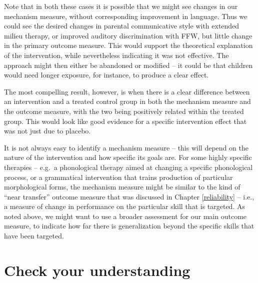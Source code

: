 \documentclass{krantz}
\begin{document}
Note that in both these cases it is possible that we might see changes in our mechanism measure, without corresponding improvement in language. Thus we could see the desired changes in parental communicative style with extended milieu therapy, or improved auditory discrimination with FFW, but little change in the primary outcome measure. This would support the theoretical explanation of the intervention, while nevertheless indicating it was not effective. The approach might then either be abandoned or modified -- it could be that children would need longer exposure, for instance, to produce a clear effect.

The most compelling result, however, is when there is a clear difference between an intervention and a treated control group in both the mechanism measure and the outcome measure, with the two being positively related within the treated group. This would look like good evidence for a specific intervention effect that was not just due to placebo.

It is not always easy to identify a mechanism measure -- this will depend on the nature of the intervention and how specific its goals are. For some highly specific therapies -- e.g.~a phonological therapy aimed at changing a specific phonological process, or a grammatical intervention that trains production of particular morphological forms, the mechanism measure might be similar to the kind of ``near transfer'' outcome measure that was discussed in Chapter \ref{reliability} -- i.e., a measure of change in performance on the particular skill that is targeted. As noted above, we might want to use a broader assessment for our main outcome measure, to indicate how far there is generalization beyond the specific skills that have been targeted.

\hypertarget{check-your-understanding-3}{%
\section{Check your understanding}\label{check-your-understanding-3}}
\end{document}
